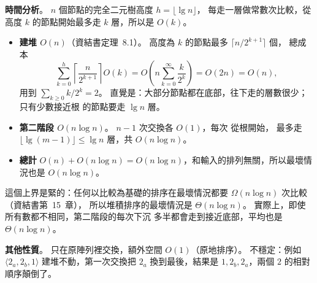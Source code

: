 \begin{pastsoln}
\textbf{時間分析}。 $n$ 個節點的完全二元樹高度 $h = \lfloor \lg n \rfloor$，
每走一層做常數次比較，從高度 $k$ 的節點開始最多走 $k$ 層，所以是 $O(k)$。
\begin{itemize}
\item \textbf{建堆 $O(n)$}（資結書定理~8.1）。 高度為 $k$ 的節點最多 $\lceil n / 2^{k+1} \rceil$ 個，
總成本
\[
\sum_{k=0}^{h} \left\lceil \frac{n}{2^{k+1}} \right\rceil O(k)
= O\!\left(n \sum_{k=0}^{\infty} \frac{k}{2^{k}}\right) = O(2n) = O(n),
\]
用到 $\sum_{k \ge 0} k/2^k = 2$。 直覺是：大部分節點都在底部，往下走的層數很少；只有少數接近根
的節點要走 $\lg n$ 層。
\item \textbf{第二階段 $O(n \log n)$}。 $n - 1$ 次交換各 $O(1)$，每次  從根開始，
最多走 $\lfloor \lg (m-1) \rfloor \le \lg n$ 層，共 $O(n \log n)$。
\item \textbf{總計} $O(n) + O(n \log n) = O(n \log n)$，和輸入的排列無關，所以最壞情況也是
$O(n \log n)$。
\end{itemize}
這個上界是緊的：任何以比較為基礎的排序在最壞情況都要 $\Omega(n \log n)$ 次比較（資結書第~15~章），
所以堆積排序的最壞情況是 $\Theta(n \log n)$。 實際上，即使所有數都不相同，第二階段的每次下沉
多半都會走到接近底部，平均也是 $\Theta(n \log n)$。

\textbf{其他性質}。 只在原陣列裡交換，額外空間 $O(1)$（原地排序）。 不穩定：例如
$\langle 2_a, 2_b, 1\rangle$ 建堆不動，第一次交換把 $2_a$ 換到最後，結果是 $1, 2_b, 2_a$，兩個 $2$
的相對順序顛倒了。
\end{pastsoln}
